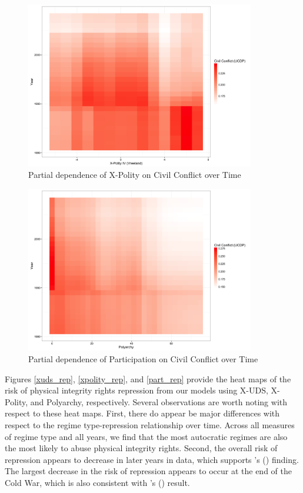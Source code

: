 \documentclass[titlepage, onecolumn,12pt]{article}
\begin{document}
\begin{figure}[h!]
\begin{center}
\includegraphics[width=100mm]{../figures/cwar_xpolity_nas_int_year_tile.png}
\end{center}
\caption{Partial dependence of X-Polity on Civil Conflict over Time}
\label{xpolity_cwar}
\end{figure}

\clearpage

\begin{figure}[ht!]
\begin{center}
\includegraphics[width=100mm]{../figures/cwar_part_int_year_tile.png}
\end{center}
\caption{Partial dependence of Participation on Civil Conflict over Time}
\label{part_cwar}
\end{figure}

Figures \ref{xuds_rep}, \ref{xpolity_rep}, and \ref{part_rep} provide the heat maps of the risk of physical integrity rights repression from our models using X-UDS, X-Polity, and Polyarchy, respectively.  Several observations are worth noting with respect to these heat maps.  First, there do appear be major differences with respect to the regime type-repression relationship over time.  Across all measures of regime type and all years, we find that the most autocratic regimes are also the most likely to abuse physical integrity rights.  Second, the overall risk of repression appears to decrease in later years in data, which supports \citeauthor{fariss2014respect}'s (\citeyear{fariss2014respect}) finding.  The largest decrease in the risk of repression appears to occur at the end of the Cold War, which is also consistent with \citeauthor{fariss2014respect}'s (\citeyear{fariss2014respect}) result.
\end{document}
